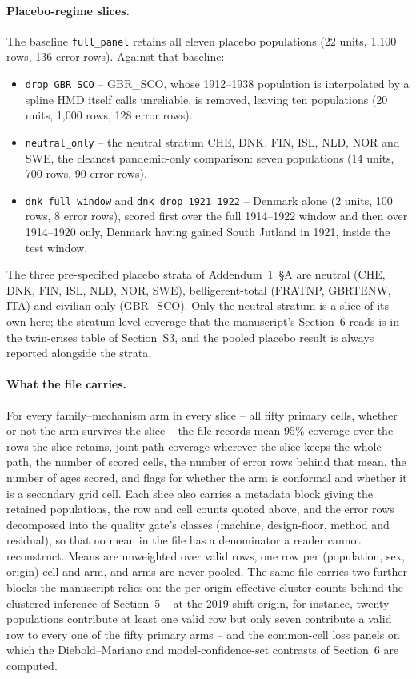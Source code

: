 \paragraph{Placebo-regime slices.} The baseline \texttt{full\_panel} retains all
eleven placebo populations (22 units, 1{,}100 rows, 136 error rows). Against
that baseline:
\begin{itemize}
\item \texttt{drop\_GBR\_SCO} -- GBR\_SCO, whose 1912--1938 population is
  interpolated by a spline HMD itself calls unreliable, is removed, leaving ten
  populations (20 units, 1{,}000 rows, 128 error rows).
\item \texttt{neutral\_only} -- the neutral stratum CHE, DNK, FIN, ISL, NLD,
  NOR and SWE, the cleanest pandemic-only comparison: seven populations
  (14 units, 700 rows, 90 error rows).
\item \texttt{dnk\_full\_window} and \texttt{dnk\_drop\_1921\_1922} -- Denmark
  alone (2 units, 100 rows, 8 error rows), scored first over the full
  1914--1922 window and then over 1914--1920 only, Denmark having gained South
  Jutland in 1921, inside the test window.
\end{itemize}
The three pre-specified placebo strata of Addendum~1~\S A are neutral (CHE,
DNK, FIN, ISL, NLD, NOR, SWE), belligerent-total (FRATNP, GBRTENW, ITA) and
civilian-only (GBR\_SCO). Only the neutral stratum is a slice of its own here;
the stratum-level coverage that the manuscript's Section~6 reads is in the
twin-crises table of Section~S3, and the pooled placebo result is always
reported alongside the strata.

\paragraph{What the file carries.} For every family--mechanism arm in every
slice -- all fifty primary cells, whether or not the arm survives the slice --
the file records mean 95\% coverage over the rows the slice retains, joint path
coverage wherever the slice keeps the whole path, the number of scored cells,
the number of error rows behind that mean, the number of ages scored, and flags
for whether the arm is conformal and whether it is a secondary grid cell. Each
slice also carries a metadata block giving the retained populations, the row and
cell counts quoted above, and the error rows decomposed into the quality gate's
classes (machine, design-floor, method and residual), so that no mean in the
file has a denominator a reader cannot reconstruct. Means are unweighted over
valid rows, one row per (population, sex, origin) cell and arm, and arms are
never pooled. The same file carries two further blocks the manuscript relies on:
the per-origin effective cluster counts behind the clustered inference of
Section~5 -- at the 2019 shift origin, for instance, twenty populations
contribute at least one valid row but only seven contribute a valid row to every
one of the fifty primary arms -- and the common-cell loss panels on which the
Diebold--Mariano and model-confidence-set contrasts of Section~6 are computed.

